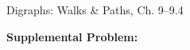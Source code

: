 \documentclass[handout]{mcs}
\begin{document}


\begin{staffnotes}
Digraphs: Walks \& Paths, Ch. 9--9.4
\end{staffnotes}




\examspace
\textbf{Supplemental Problem:}



\iffalse
\pinput{CP_covering_edges}  %
\pinput{CP_tournament_chain}
\fi


\end{document}
